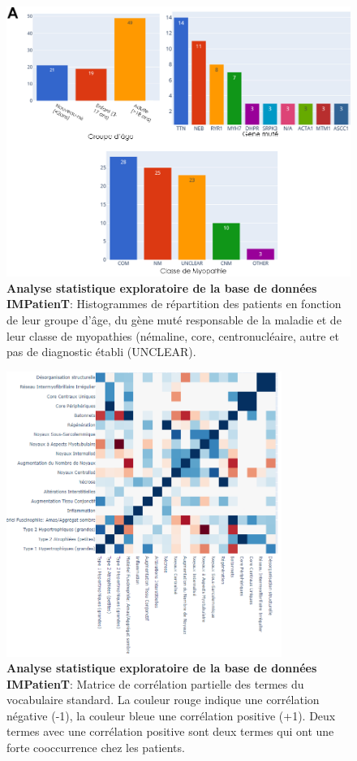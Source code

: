\begin{figure}[!ht]
  \centering
  \includegraphics[width=1\textwidth]{figures/impatient_explo.png}
  \caption[Analyse statistique exploratoire IMPatienT (histogrammes)]{\textbf{Analyse statistique exploratoire de la base de données IMPatienT}: Histogrammes de répartition des patients en fonction de leur groupe d'âge, du gène muté responsable de la maladie et de leur classe de myopathies (némaline, core, centronucléaire, autre et pas de diagnostic établi (UNCLEAR).}
  \label{fig:impatient_eda}
\end{figure}
\begin{figure}[!ht]
  \centering
  \includegraphics[width=0.8\textwidth]{figures/impatient_explo2.png}
  \caption[Analyse statistique exploratoire IMPatienT (matrice)]{\textbf{Analyse statistique exploratoire de la base de données IMPatienT}: Matrice de corrélation partielle des termes du vocabulaire standard. La couleur rouge indique une corrélation négative (-1), la couleur bleue une corrélation positive (+1). Deux termes avec une corrélation positive sont deux termes qui ont une forte cooccurrence chez les patients.}
  \label{fig:impatient_eda2}
\end{figure}

